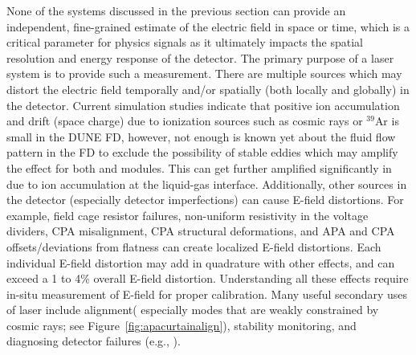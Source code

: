 None of the systems discussed in the previous section can  provide an independent, fine-grained estimate of the electric field in space or time, which is a critical parameter for physics signals as it ultimately impacts the spatial resolution and energy response of the detector. The primary purpose of a laser system is to provide such a measurement. There are multiple sources which may distort the electric field temporally and\slash or spatially (both locally and globally) in the detector. Current simulation studies indicate that positive ion accumulation and drift (space charge) due to ionization sources such as cosmic rays or ${}^{39}$Ar is small in the DUNE FD, however, not enough is known yet about the fluid flow pattern in the FD to exclude the possibility of stable eddies which may amplify the effect for both  and  modules. This can get further amplified significantly in  due to ion accumulation at the liquid-gas interface. 
Additionally, other sources in the detector (especially detector imperfections) can cause E-field distortions. For example, field cage resistor failures, non-uniform resistivity in the voltage dividers, CPA misalignment, CPA structural deformations, and APA and CPA offsets\slash deviations from flatness can create localized E-field distortions. Each individual E-field distortion may add in quadrature with other effects, and can exceed a 1 to 4\% overall E-field distortion. Understanding all these effects require in-situ measurement of E-field for proper calibration. 
Many useful secondary uses of laser include alignment( especially modes that are weakly constrained by cosmic rays; see Figure~\ref{fig:apacurtainalign}), stability monitoring, and diagnosing detector failures (e.g., ).  

